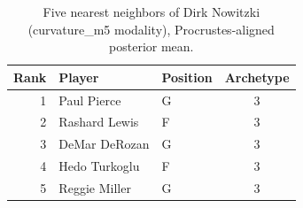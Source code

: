 \begin{table}[htbp]
  \centering\small
  \begin{tabular}{rllc}
    \toprule
    Rank & Player & Position & Archetype \\
    \midrule
    1 & Paul Pierce & G & 3 \\
    2 & Rashard Lewis & F & 3 \\
    3 & DeMar DeRozan & G & 3 \\
    4 & Hedo Turkoglu & F & 3 \\
    5 & Reggie Miller & G & 3 \\
    \bottomrule
  \end{tabular}
  \caption{Five nearest neighbors of Dirk Nowitzki (curvature_m5 modality), Procrustes-aligned posterior mean.}
  \label{tab:Dirk_Nowitzki_neighbors_curvature_m5}
\end{table}

